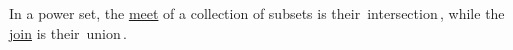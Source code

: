 
In a power set, the \hyperref[D1.81]{meet} of a collection of subsets is their \,intersection\,, while the \hyperref[D1.81]{join} is their \,union\,.